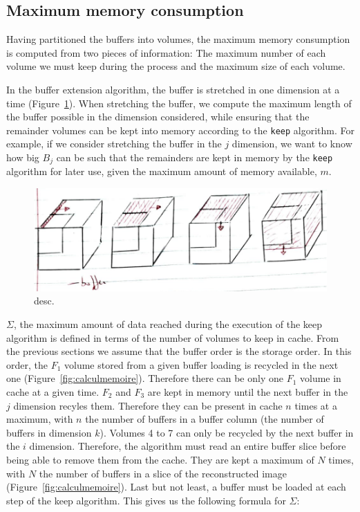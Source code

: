 \documentclass[conference]{IEEEtran}
\begin{document}
\subsection{Maximum memory consumption}

Having partitioned the buffers into volumes, the maximum memory consumption is
computed from two pieces of information: The maximum number of each volume we
must keep during the process and the maximum size of each volume.

In the buffer extension algorithm, the buffer is stretched in one dimension at
a time (Figure~\ref{fig:bufferextensionalgo}).
When stretching the buffer, we compute the maximum length of the buffer possible
in the dimension considered, while ensuring that the remainder volumes can be
kept into memory according to the \texttt{keep} algorithm. For example, if
we consider stretching the buffer in the $j$ dimension, we want to know how big
$B_j$ can be such that the remainders are kept in memory by the \texttt{keep}
algorithm for later use, given the maximum amount of memory available, $m$.

\begin{figure}[h]
\centering
\includegraphics[scale=0.4]{./figures/new/bufferextensionalgo.png}
\caption{desc.}
\label{fig:bufferextensionalgo}
\end{figure}

$\Sigma$, the maximum amount of data reached during the execution of the keep
algorithm is defined in terms of the number of volumes to keep in cache. From the
previous sections we assume that the buffer order is the storage order.
In this order, the $F_1$ volume stored from a given buffer loading is recycled
in the next one (Figure~\ref{fig:calculmemoire}). Therefore there can be only
one $F_1$ volume in cache at a
given time. $F_2$ and $F_3$ are kept in memory until the next
buffer in the $j$ dimension recyles them. Therefore they can be present in cache
$n$ times at a maximum, with $n$ the number of buffers in a buffer column (the
number of buffers in dimension $k$). Volumes 4 to 7 can only be recycled by the
next buffer in the $i$ dimension. Therefore, the algorithm must read an entire
buffer slice before being able to remove them from the cache. They are kept a
maximum of $N$ times, with $N$ the number of buffers in a slice of the
reconstructed image (Figure~\ref{fig:calculmemoire}).
Last but not least, a buffer must be loaded at each step of
the keep algorithm. This gives us the following formula for $\Sigma$:
\end{document}
